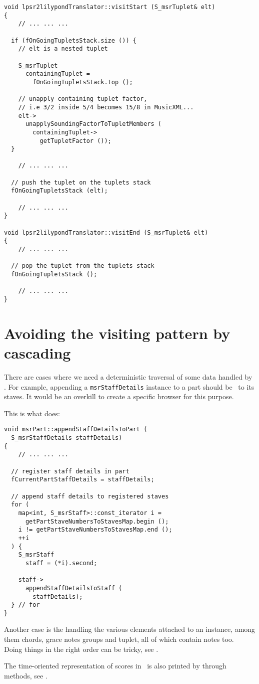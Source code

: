 \begin{lstlisting}[language=CPlusPlus]
void lpsr2lilypondTranslator::visitStart (S_msrTuplet& elt)
{
	// ... ... ...

  if (fOnGoingTupletsStack.size ()) {
    // elt is a nested tuplet

    S_msrTuplet
      containingTuplet =
        fOnGoingTupletsStack.top ();

    // unapply containing tuplet factor,
    // i.e 3/2 inside 5/4 becomes 15/8 in MusicXML...
    elt->
      unapplySoundingFactorToTupletMembers (
        containingTuplet->
          getTupletFactor ());
  }

	// ... ... ...

  // push the tuplet on the tuplets stack
  fOnGoingTupletsStack (elt);

	// ... ... ...
}

void lpsr2lilypondTranslator::visitEnd (S_msrTuplet& elt)
{
	// ... ... ...

  // pop the tuplet from the tuplets stack
  fOnGoingTupletsStack ();

	// ... ... ...
}
\end{lstlisting}


\section{Avoiding the visiting pattern by cascading}

There are cases where we need a deterministic traversal of some data handled by \mf. For example, appending a {\tt msrStaffDetails} instance to a part should be \cascaded\ to its staves. It would be an overkill to create a specific browser for this purpose.

This is what  does:
\begin{lstlisting}[language=CPlusPlus]
void msrPart::appendStaffDetailsToPart (
  S_msrStaffDetails staffDetails)
{
	// ... ... ...

  // register staff details in part
  fCurrentPartStaffDetails = staffDetails;

  // append staff details to registered staves
  for (
    map<int, S_msrStaff>::const_iterator i =
      getPartStaveNumbersToStavesMap.begin ();
    i != getPartStaveNumbersToStavesMap.end ();
    ++i
  ) {
    S_msrStaff
      staff = (*i).second;

    staff->
      appendStaffDetailsToStaff (
        staffDetails);
  } // for
}
\end{lstlisting}

Another case is the handling the various elements attached to an  instance, among them chords, grace notes groups and tuplet, all of which contain notes too. \\
Doing things in the right order can be tricky, see .

The time-oriented representation of scores in \msrRepr\ is also printed by \cascading through  methods, see .
